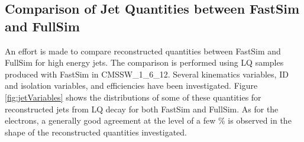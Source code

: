 %

\subsection{Comparison of Jet Quantities between FastSim and FullSim}

An effort is made to compare reconstructed quantities between FastSim and FullSim for high energy jets.
The comparison is performed using LQ samples produced with FastSim in CMSSW\_1\_6\_12. 
Several kinematics variables, ID and isolation variables, and efficiencies have been investigated. 
Figure \ref{fig:jetVariables} shows the distributions of some of these quantities for reconstructed jets from LQ decay 
for both FastSim and FullSim.
As for the electrons, a generally good agreement at the level of a few \% is observed in the shape of the reconstructed quantities investigated.


